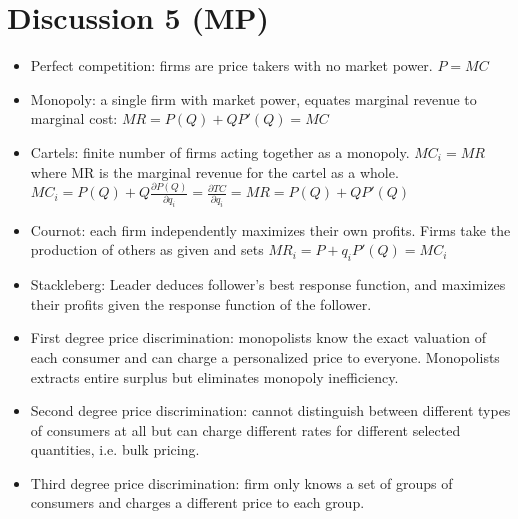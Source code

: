 \documentclass[11pt]{article} %
\begin{document}
\section{Discussion 5 (MP)}
\begin{itemize}
\item Perfect competition: firms are price takers with no market power. $P = MC$
\item Monopoly: a single firm with market power, equates marginal revenue to marginal cost: $MR = P(Q) + QP'(Q) = MC$
\item Cartels: finite number of firms acting together as a monopoly. $MC_i = MR$ where MR is the marginal revenue for the cartel as a whole. $MC_i = P(Q) + Q \frac{\partial P(Q)}{\partial q_i} =\frac{\partial TC}{ \partial q_i} = MR = P(Q) + QP'(Q)$
\item Cournot: each firm independently maximizes their own profits. Firms take the production of others as given and sets $MR_i = P + q_iP'(Q) = MC_i$
\item Stackleberg: Leader deduces follower's best response function, and maximizes their profits given the response function of the follower.
\item First degree price discrimination: monopolists know the exact valuation of each consumer and can charge a personalized price to everyone. Monopolists extracts entire surplus but eliminates monopoly inefficiency.
\item Second degree price discrimination: cannot distinguish between different types of consumers at all but can charge different rates for different selected quantities, i.e. bulk pricing.
\item Third degree price discrimination: firm only knows a set of groups of consumers and charges a different price to each group.
\end{itemize}
\end{document}
